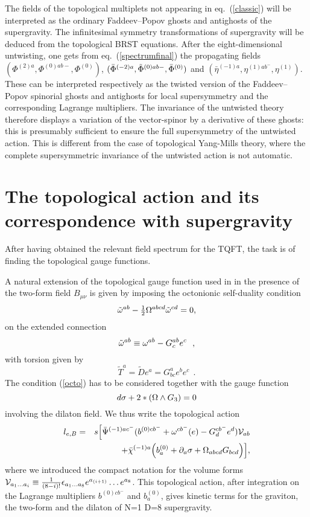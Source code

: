 \documentclass[a4paper,12pt]{article}
\def\demi{{\textstyle {1\over2}}}
\def\L{l}
\def\V{{\cal V}}
\begin{document}
The fields of the topological multiplets not appearing in
eq.~(\ref{classic}) will be interpreted as the ordinary 
Faddeev--Popov ghosts and antighosts of the supergravity. 
The infinitesimal symmetry transformations of supergravity
will be deduced from the topological BRST equations.
After the eight-dimensional
untwisting, one gets from 
eq.~(\ref{spectrumfinal}) the propagating fields 
$(\Phi^{(2)a},  {\Phi}^{(0)ab -},\Phi^{(0)})$, 
$(\bar \Phi^{(-2)a},  {\tilde \Phi}^{(0)ab -},\bar \Phi^{(0)})$
and $(\bar \eta^{(-1)a},   \eta^{(1)ab ^-} , \eta^{(1)})$.
These can be interpreted respectively as 
the twisted version of the Faddeev--Popov spinorial 
ghosts and antighosts for local supersymmetry and the
corresponding Lagrange multipliers. 
The invariance of the untwisted theory therefore displays a
variation of the vector-spinor by a derivative of these ghosts:
this is presumably sufficient to ensure the full supersymmetry
of the untwisted action.
This is different from the case of topological Yang-Mills theory, where
the complete supersymmetric invariance of the untwisted action is not
automatic.


\section{The topological action and its correspondence with supergravity}

After having obtained the relevant field spectrum for the TQFT, the task
is of finding the topological gauge functions. 

A natural extension of the topological gauge function used in 
\cite{BT2} in the presence of the two-form field $B_{\mu\nu}$
is given by imposing the octonionic self-duality condition
\begin{equation}\label{octo}
\tilde\o^{ab}-\demi \O^{abcd} \tilde\o^{cd}=0,
\end{equation}
on the extended connection
\begin{equation}
\tilde{\omega}^{ab}\equiv \omega^{ab}- G^{ab}_c e^c  \ \ ,
\label{otilde}
\end{equation}
with torsion given by
\begin{equation}
\tilde T^a = \tilde D e^a = G^a_{bc}e^b e^c \ \ .
\label{torsion}
\end{equation}
The condition (\ref{octo}) has to be considered together with 
the gauge function
\begin{equation}
d\sigma + 2 *(\Omega\wedge G_3) =0
\label{g-sigma}
\end{equation}
involving the dilaton field.
We thus write the topological action
\begin{eqnarray}\label{top-act}
\L_{e,B}&=& s 
\Big[ 
\bar \Psi^{(-1)ac^-} (b ^{(0)cb^-} + \o^{cb^-}(e) - G_d^{cb^-} e^d)\V_{ab}  \cr
&&\ \ +\bar\chi^{(-1)a} \Big (b^{(0)}_a +\partial_a \sigma
+\Omega_{abcd}G_{bcd}  \Big  ) \Big],
\end{eqnarray}
where we introduced the compact notation for the volume forms 
${\cal V}_{a_1\ldots a_i}\equiv {1\over (8-i)!} 
\epsilon_{a_1\ldots a_8}e^{a_{(i+1)}}\ldots e^{a_8}$. 
This topological action, after integration on the Lagrange multipliers
$b^{(0)cb^-}$ and $b^{(0)}_a$, gives kinetic terms for the graviton, the
two-form and the dilaton of N=1 D=8 supergravity.
\end{document}
